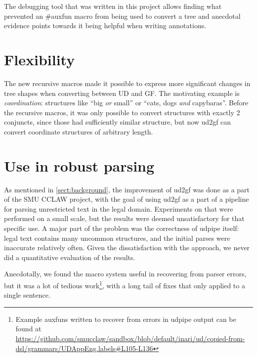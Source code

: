 The debugging tool that was written in this project allows finding what prevented an \#auxfun macro from being used to convert a tree and anecdotal evidence points towards it being helpful when writing annotations.


\section{Flexibility}


The new recursive macros made it possible to express more significant changes in tree shapes when converting between UD and GF. The motivating example is \emph{coordination}: structures like ``big \emph{or} small'' or ``cats, dogs \emph{and} capybaras''. Before the recursive macros, it was only possible to convert structures with exactly 2 conjuncts, since those had sufficiently similar structure, but now ud2gf can convert coordinate structures of arbitrary length.


\section{Use in robust parsing}

As mentioned in \autoref{sect:background}, the improvement of ud2gf was done as a part of the SMU CCLAW project, with the goal of using ud2gf as a part of a pipeline for parsing unrestricted text in the legal domain.
Experiments on that were performed on a small scale, but the results were deemed unsatisfactory for that specific use. A major part of the problem was the correctness of udpipe itself: legal text contains many uncommon structures, and the initial parses were inaccurate relatively often. 
Given the dissatisfaction with the approach, we never did a quantitative evaluation of the results.

Anecdotally, we found the macro system useful in recovering from parser errors, but it was a lot of tedious work\footnote{Example auxfuns written to recover from errors in udpipe output can be found at \url{https://github.com/smucclaw/sandbox/blob/default/inari/ud/copied-from-dsl/grammars/UDAppEng.labels\#L105-L136}}, with a long tail of fixes that only applied to a single sentence. 



%

